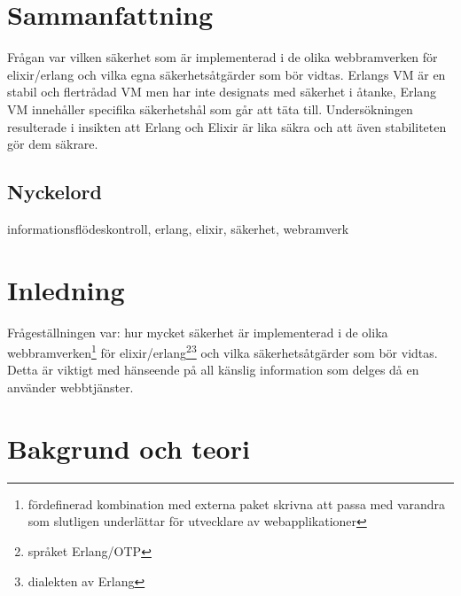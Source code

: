 \documentclass[12pt]{article}
\begin{document}
\maketitle

	 	 	 	 	
	
\section*{Sammanfattning}
Frågan var vilken säkerhet som är implementerad i de olika webbramverken för elixir/erlang och vilka egna säkerhetsåtgärder som bör vidtas. 
Erlangs VM är en stabil och flertrådad VM men har inte designats med säkerhet i åtanke, Erlang VM innehåller specifika säkerhetshål som går att täta till.
Undersökningen resulterade i insikten att Erlang och Elixir är lika säkra och att även stabiliteten gör dem säkrare.
	
\subsection*{Nyckelord}
informationsflödeskontroll, erlang, elixir, säkerhet, webramverk
	
\section{Inledning}

Frågeställningen var: hur mycket säkerhet är implementerad i de olika webbramverken\footnote{fördefinerad kombination med externa paket skrivna att passa med varandra som slutligen underlättar för utvecklare av webapplikationer} för elixir/erlang\footnote{språket Erlang/OTP\cite{erlang}}\footnote{dialekten av Erlang\cite{elixir}} och vilka säkerhetsåtgärder som bör vidtas. 
Detta är viktigt med hänseende på all känslig information som delges då en använder webbtjänster.\\



 \section{Bakgrund och teori}
\end{document}
